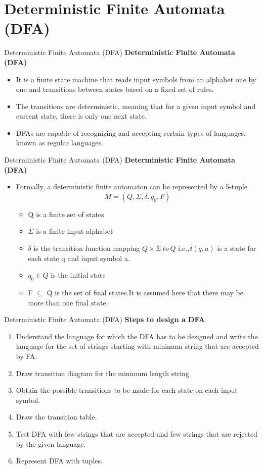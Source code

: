 \documentclass{beamer}
\begin{document}
\section{Deterministic Finite Automata (DFA)}
\begin{frame}{Deterministic Finite Automata (DFA)}
	\textbf{Deterministic Finite Automata (DFA)}
	\begin{itemize}
		\item It is a finite state machine that reads input symbols from an alphabet one by one and transitions between states based on a fixed set of rules.
		\item The transitions are deterministic, meaning that for a given input symbol and current state, there is only one next state. 
		\item DFAs are capable of recognizing and accepting certain types of languages, known as regular languages.
	\end{itemize}
\end{frame}
\begin{frame}{Deterministic Finite Automata (DFA)}
	\textbf{Deterministic Finite Automata (DFA)}
	\begin{itemize}
		\item Formally, a deterministic finite automaton can be represented by a 5-tuple $$M=(Q,\Sigma,\delta,q_0,F)$$
		\begin{itemize}
			\item Q is a finite set of states
			\item $\Sigma$ is a finite input alphabet
			\item $\delta$ is the transition function mapping $ Q \times \Sigma\  to\  Q$ i.e.,$\delta(q,a)$ is a state for each state q and input symbol a.
			\item $q_0 \in Q$ is the initial state
			\item F $\subseteq$ Q is the set of final states.It is assumed here that there may be
			more than one final state.
		\end{itemize}
	\end{itemize}
\end{frame}
\begin{frame}{Deterministic Finite Automata (DFA)}
	\textbf{Steps to design a DFA}
	\begin{enumerate}
		\item Understand the language for which the DFA has to be designed and write 
		the language for the set of strings starting with minimum string that are 
		accepted by FA.

		\item Draw transition diagram for the minimum length string.
		\item Obtain the possible transitions to be made for each state on each input 
		symbol.
		\item Draw the transition table.
		\item Test DFA with few strings that are accepted and few strings that are 
		rejected by the given language.
		\item Represent DFA with tuples.
	\end{enumerate}
\end{frame}
\end{document}
